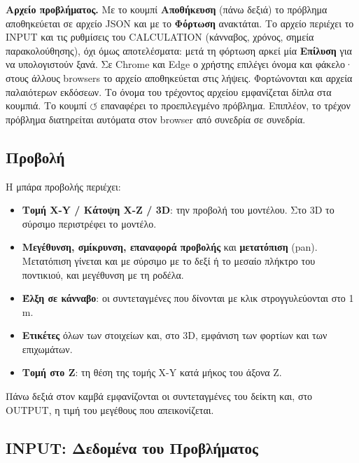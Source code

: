 \documentclass[11pt,a4paper]{article}
\begin{document}
\textbf{Αρχείο προβλήματος.} Με το κουμπί \textbf{Αποθήκευση} (πάνω δεξιά) το πρόβλημα αποθηκεύεται σε αρχείο JSON και με το \textbf{Φόρτωση} ανακτάται. Το αρχείο περιέχει το INPUT και τις ρυθμίσεις του CALCULATION (κάνναβος, χρόνος, σημεία παρακολούθησης), όχι όμως αποτελέσματα: μετά τη φόρτωση αρκεί μία \textbf{Επίλυση} για να υπολογιστούν ξανά. Σε Chrome και Edge ο χρήστης επιλέγει όνομα και φάκελο· στους άλλους browsers το αρχείο αποθηκεύεται στις λήψεις. Φορτώνονται και αρχεία παλαιότερων εκδόσεων. Το όνομα του τρέχοντος αρχείου εμφανίζεται δίπλα στα κουμπιά. Το κουμπί $\circlearrowleft$ επαναφέρει το προεπιλεγμένο πρόβλημα. Επιπλέον, το τρέχον πρόβλημα διατηρείται αυτόματα στον browser από συνεδρία σε συνεδρία.

\subsection{Προβολή}\label{sec:viewer}

Η μπάρα προβολής περιέχει:
\begin{itemize}
  \item \textbf{Τομή X-Y / Κάτοψη X-Z / 3D}: την προβολή του μοντέλου. Στο 3D το σύρσιμο περιστρέφει το μοντέλο.
  \item \textbf{Μεγέθυνση, σμίκρυνση, επαναφορά προβολής} και \textbf{μετατόπιση} (pan). Μετατόπιση γίνεται και με σύρσιμο με το δεξί ή το μεσαίο πλήκτρο του ποντικιού, και μεγέθυνση με τη ροδέλα.
  \item \textbf{Έλξη σε κάνναβο}: οι συντεταγμένες που δίνονται με κλικ στρογγυλεύονται στο 1 m.
  \item \textbf{Ετικέτες} όλων των στοιχείων και, στο 3D, εμφάνιση των φορτίων και των επιχωμάτων.
  \item \textbf{Τομή στο Z}: τη θέση της τομής X-Y κατά μήκος του άξονα Z.
\end{itemize}
Πάνω δεξιά στον καμβά εμφανίζονται οι συντεταγμένες του δείκτη και, στο OUTPUT, η τιμή του μεγέθους που απεικονίζεται.

\subsection{INPUT: Δεδομένα του Προβλήματος}
\end{document}
